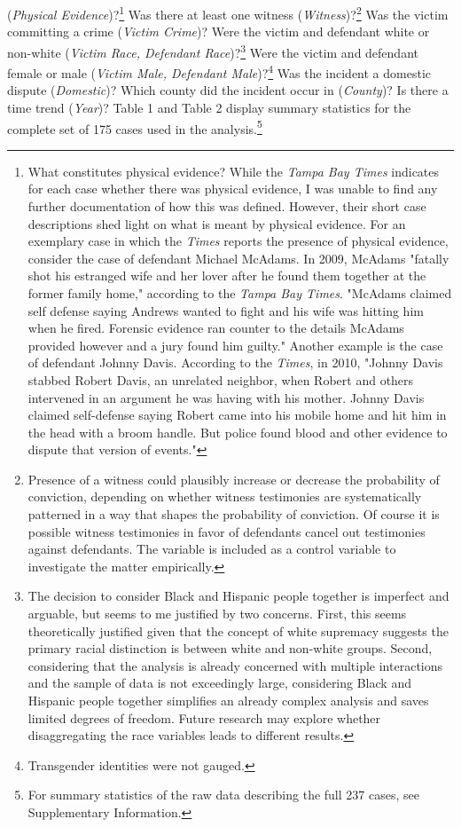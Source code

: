 \documentclass[12pt,article]{article}
\begin{document}
(\emph{Physical Evidence})?\footnote{What constitutes physical evidence? While the \emph{Tampa Bay Times} indicates for each case whether there was physical evidence, I was unable to find any further documentation of how this was defined. However, their short case descriptions shed light on what is meant by physical evidence. For an exemplary case in which the \emph{Times} reports the presence of physical evidence, consider the case of defendant Michael McAdams. In 2009, McAdams "fatally shot his estranged wife and her lover after he found them together at the former family home," according to the \emph{Tampa Bay Times}. "McAdams claimed self defense saying Andrews wanted to fight and his wife was hitting him when he fired. Forensic evidence ran counter to the details McAdams provided however and a jury found him guilty." Another example is the case of defendant Johnny Davis. According to the \emph{Times}, in 2010, "Johnny Davis stabbed Robert Davis, an unrelated neighbor, when Robert and others intervened in an argument he was having with his mother. Johnny Davis claimed self-defense saying Robert came into his mobile home and hit him in the head with a broom handle. But police found blood and other evidence to dispute that version of events."} Was there at least one witness (\emph{Witness})?\footnote{Presence of a witness
could plausibly increase or decrease the probability of conviction, depending on whether witness testimonies
are systematically patterned in a way that shapes the probability of conviction. Of course it is possible witness testimonies
in favor of defendants cancel out testimonies against defendants. The variable is included as a control variable to investigate the matter empirically.} Was the
victim committing a crime (\emph{Victim Crime})? Were the victim and defendant
white or non-white (\emph{Victim Race, Defendant Race})?\footnote{The decision
  to consider Black and Hispanic people together is imperfect and
  arguable, but seems to me justified by two concerns. First, this seems
  theoretically justified given that the concept of white supremacy
  suggests the primary racial distinction is between white and non-white
  groups. Second, considering that the analysis is already concerned
  with multiple interactions and the sample of data is not exceedingly
  large, considering Black and Hispanic people together simplifies an
  already complex analysis and saves limited degrees of freedom. Future
  research may explore whether disaggregating the race variables leads
  to different results.} Were the victim and defendant female or male
(\emph{Victim Male, Defendant Male})?\footnote{Transgender identities were not
  gauged.} Was the incident a domestic dispute (\emph{Domestic})? Which county
did the incident occur in (\emph{County})? Is there a time trend (\emph{Year})? Table 1 and Table 2 display summary statistics for the
complete set of 175 cases used in the analysis.\footnote{For summary statistics of the raw data describing the full 237 cases, see Supplementary Information.}
\end{document}
